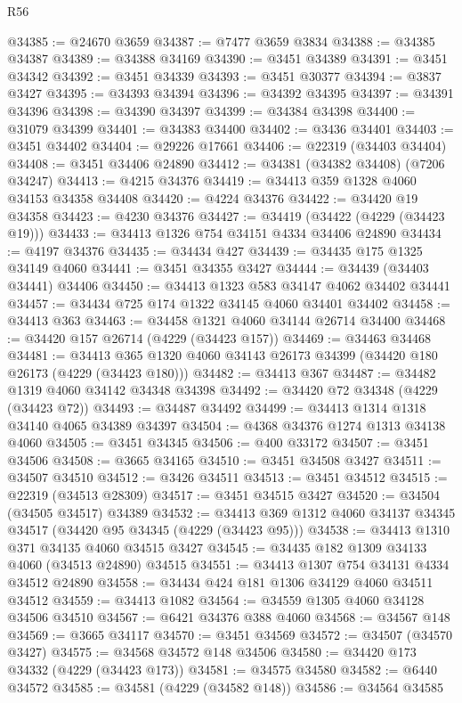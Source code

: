 \begin{lexlean}{R56}
\begin{coremodule}
@34385 := @24670 @3659
@34387 := @7477 @3659 @3834
@34388 := @34385 @34387
@34389 := @34388 @34169
@34390 := @3451 @34389
@34391 := @3451 @34342
@34392 := @3451 @34339
@34393 := @3451 @30377
@34394 := @3837 @3427
@34395 := @34393 @34394
@34396 := @34392 @34395
@34397 := @34391 @34396
@34398 := @34390 @34397
@34399 := @34384 @34398
@34400 := @31079 @34399
@34401 := @34383 @34400
@34402 := @3436 @34401
@34403 := @3451 @34402
@34404 := @29226 @17661
@34406 := @22319 (@34403 @34404)
@34408 := @3451 @34406 @24890
@34412 := @34381 (@34382 @34408) (@7206 @34247)
@34413 := @4215 @34376
@34419 := @34413 @359 @1328 @4060 @34153 @34358 @34408
@34420 := @4224 @34376
@34422 := @34420 @19 @34358
@34423 := @4230 @34376
@34427 := @34419 (@34422 (@4229 (@34423 @19)))
@34433 := @34413 @1326 @754 @34151 @4334 @34406 @24890
@34434 := @4197 @34376
@34435 := @34434 @427
@34439 := @34435 @175 @1325 @34149 @4060
@34441 := @3451 @34355 @3427
@34444 := @34439 (@34403 @34441) @34406
@34450 := @34413 @1323 @583 @34147 @4062 @34402 @34441
@34457 := @34434 @725 @174 @1322 @34145 @4060 @34401 @34402
@34458 := @34413 @363
@34463 := @34458 @1321 @4060 @34144 @26714 @34400
@34468 := @34420 @157 @26714 (@4229 (@34423 @157))
@34469 := @34463 @34468
@34481 := @34413 @365 @1320 @4060 @34143 @26173 @34399 (@34420 @180 @26173 (@4229 (@34423 @180)))
@34482 := @34413 @367
@34487 := @34482 @1319 @4060 @34142 @34348 @34398
@34492 := @34420 @72 @34348 (@4229 (@34423 @72))
@34493 := @34487 @34492
@34499 := @34413 @1314 @1318 @34140 @4065 @34389 @34397
@34504 := @4368 @34376 @1274 @1313 @34138 @4060
@34505 := @3451 @34345
@34506 := @400 @33172
@34507 := @3451 @34506
@34508 := @3665 @34165
@34510 := @3451 @34508 @3427
@34511 := @34507 @34510
@34512 := @3426 @34511
@34513 := @3451 @34512
@34515 := @22319 (@34513 @28309)
@34517 := @3451 @34515 @3427
@34520 := @34504 (@34505 @34517) @34389
@34532 := @34413 @369 @1312 @4060 @34137 @34345 @34517 (@34420 @95 @34345 (@4229 (@34423 @95)))
@34538 := @34413 @1310 @371 @34135 @4060 @34515 @3427
@34545 := @34435 @182 @1309 @34133 @4060 (@34513 @24890) @34515
@34551 := @34413 @1307 @754 @34131 @4334 @34512 @24890
@34558 := @34434 @424 @181 @1306 @34129 @4060 @34511 @34512
@34559 := @34413 @1082
@34564 := @34559 @1305 @4060 @34128 @34506 @34510
@34567 := @6421 @34376 @388 @4060
@34568 := @34567 @148
@34569 := @3665 @34117
@34570 := @3451 @34569
@34572 := @34507 (@34570 @3427)
@34575 := @34568 @34572 @148 @34506
@34580 := @34420 @173 @34332 (@4229 (@34423 @173))
@34581 := @34575 @34580
@34582 := @6440 @34572
@34585 := @34581 (@4229 (@34582 @148))
@34586 := @34564 @34585

\end{coremodule}
\end{lexlean}
